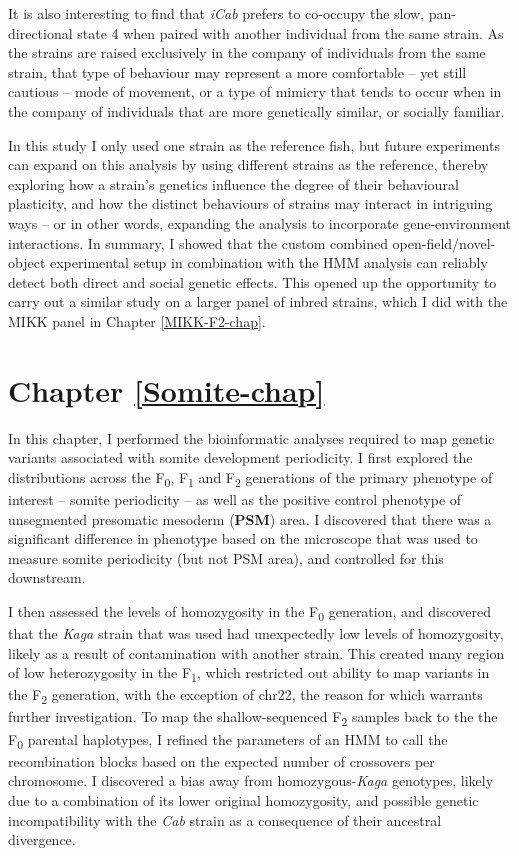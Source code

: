 \documentclass[
]{book}
\begin{document}
It is also interesting to find that \emph{iCab} prefers to co-occupy the slow, pan-directional state 4 when paired with another individual from the same strain. As the strains are raised exclusively in the company of individuals from the same strain, that type of behaviour may represent a more comfortable -- yet still cautious -- mode of movement, or a type of mimicry that tends to occur when in the company of individuals that are more genetically similar, or socially familiar.

In this study I only used one strain as the reference fish, but future experiments can expand on this analysis by using different strains as the reference, thereby exploring how a strain's genetics influence the degree of their behavioural plasticity, and how the distinct behaviours of strains may interact in intriguing ways -- or in other words, expanding the analysis to incorporate gene-environment interactions. In summary, I showed that the custom combined open-field/novel-object experimental setup in combination with the HMM analysis can reliably detect both direct and social genetic effects. This opened up the opportunity to carry out a similar study on a larger panel of inbred strains, which I did with the MIKK panel in Chapter \ref{MIKK-F2-chap}.

\hypertarget{chapter-refsomite-chap}{%
\section*{Chapter \ref{Somite-chap}}\label{chapter-refsomite-chap}}

In this chapter, I performed the bioinformatic analyses required to map genetic variants associated with somite development periodicity. I first explored the distributions across the F\textsubscript{0}, F\textsubscript{1} and F\textsubscript{2} generations of the primary phenotype of interest -- somite periodicity -- as well as the positive control phenotype of unsegmented presomatic mesoderm (\textbf{PSM}) area. I discovered that there was a significant difference in phenotype based on the microscope that was used to measure somite periodicity (but not PSM area), and controlled for this downstream.

I then assessed the levels of homozygosity in the F\textsubscript{0} generation, and discovered that the \emph{Kaga} strain that was used had unexpectedly low levels of homozygosity, likely as a result of contamination with another strain. This created many region of low heterozygosity in the F\textsubscript{1}, which restricted out ability to map variants in the F\textsubscript{2} generation, with the exception of chr22, the reason for which warrants further investigation. To map the shallow-sequenced F\textsubscript{2} samples back to the the F\textsubscript{0} parental haplotypes, I refined the parameters of an HMM to call the recombination blocks based on the expected number of crossovers per chromosome. I discovered a bias away from homozygous-\emph{Kaga} genotypes, likely due to a combination of its lower original homozygosity, and possible genetic incompatibility with the \emph{Cab} strain as a consequence of their ancestral divergence.
\end{document}
